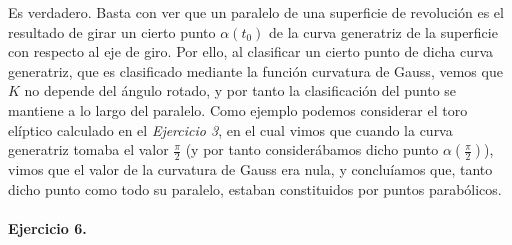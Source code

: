 \documentclass[fleqn]{article}
\begin{document}
    Es verdadero. Basta con ver que un paralelo de una superficie de revolución es el resultado de girar un cierto punto $\alpha(t_0)$ de la curva generatriz de la superficie con respecto
    al eje de giro. Por ello, al clasificar un cierto punto de dicha curva generatriz, que es clasificado mediante la función curvatura de Gauss, vemos que $K$ no depende del ángulo rotado,
    y por tanto la clasificación del punto se mantiene a lo largo del paralelo. Como ejemplo podemos considerar el toro elíptico calculado en el \textit{Ejercicio 3}, en el cual vimos que 
    cuando la curva generatriz tomaba el valor $\frac{\pi}{2}$ (y por tanto considerábamos dicho punto $\alpha(\frac{\pi}{2})$), vimos que el valor de la curvatura de Gauss era nula, y concluíamos
    que, tanto dicho punto como todo su paralelo, estaban constituidos por puntos parabólicos. \\ \\

    \textbf{Ejercicio 6. } \\
\end{document}

